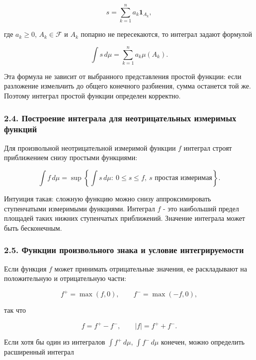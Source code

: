 \documentclass[
  11pt,
  a4paper,
]{article}
\begin{document}
\[
s=\sum_{k=1}^n a_k\mathbf 1_{A_k},
\]

где \(a_k\ge0\), \(A_k\in\mathcal F\) и \(A_k\) попарно не пересекаются,
то интеграл задают формулой

\[
\int s\,d\mu=\sum_{k=1}^n a_k\mu(A_k).
\]

Эта формула не зависит от выбранного представления простой функции: если
разложение измельчить до общего конечного разбиения, сумма останется той
же. Поэтому интеграл простой функции определен корректно.

\subsubsection{2.4. Построение интеграла для неотрицательных измеримых
функций}\label{ux43fux43eux441ux442ux440ux43eux435ux43dux438ux435-ux438ux43dux442ux435ux433ux440ux430ux43bux430-ux434ux43bux44f-ux43dux435ux43eux442ux440ux438ux446ux430ux442ux435ux43bux44cux43dux44bux445-ux438ux437ux43cux435ux440ux438ux43cux44bux445-ux444ux443ux43dux43aux446ux438ux439}

Для произвольной неотрицательной измеримой функции \(f\) интеграл строят
приближением снизу простыми функциями:

\[
\int f\,d\mu
=
\sup\left\{\int s\,d\mu:\ 0\le s\le f,\ s\text{ простая измеримая}\right\}.
\]

Интуиция такая: сложную функцию можно снизу аппроксимировать
ступенчатыми измеримыми функциями. Интеграл \(f\) - это наибольший
предел площадей таких нижних ступенчатых приближений. Значение интеграла
может быть бесконечным.

\subsubsection{2.5. Функции произвольного знака и условие
интегрируемости}\label{ux444ux443ux43dux43aux446ux438ux438-ux43fux440ux43eux438ux437ux432ux43eux43bux44cux43dux43eux433ux43e-ux437ux43dux430ux43aux430-ux438-ux443ux441ux43bux43eux432ux438ux435-ux438ux43dux442ux435ux433ux440ux438ux440ux443ux435ux43cux43eux441ux442ux438}

Если функция \(f\) может принимать отрицательные значения, ее
раскладывают на положительную и отрицательную части:

\[
f^+=\max(f,0),\qquad
f^-=\max(-f,0),
\]

так что

\[
f=f^+-f^-,
\qquad
|f|=f^++f^-.
\]

Если хотя бы один из интегралов \(\int f^+\,d\mu\), \(\int f^-\,d\mu\)
конечен, можно определить расширенный интеграл
\end{document}
